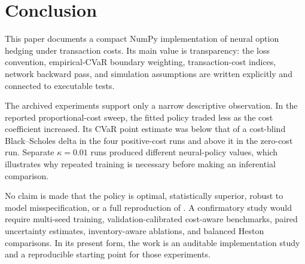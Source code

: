 \section{Conclusion}

This paper documents a compact NumPy implementation of neural option hedging
under transaction costs. Its main value is transparency: the loss convention,
empirical-CVaR boundary weighting, transaction-cost indices, network backward
pass, and simulation assumptions are written explicitly and connected to
executable tests.

The archived experiments support only a narrow descriptive observation. In the
reported proportional-cost sweep, the fitted policy traded less as the cost
coefficient increased. Its CVaR point estimate was below that of a cost-blind
Black--Scholes delta in the four positive-cost runs and above it in the
zero-cost run. Separate $\kappa=0.01$ runs produced different neural-policy
values, which illustrates why repeated training is necessary before making an
inferential comparison.

No claim is made that the policy is optimal, statistically superior, robust to
model misspecification, or a full reproduction of \citet{buehler2019}. A
confirmatory study would require multi-seed training, validation-calibrated
cost-aware benchmarks, paired uncertainty estimates, inventory-aware
ablations, and balanced Heston comparisons. In its present form, the work is an
auditable implementation study and a reproducible starting point for those
experiments.

